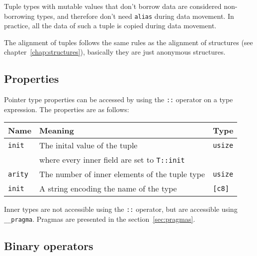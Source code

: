 Tuple types with mutable values that don't borrow data are considered
non-borrowing types, and therefore don't need \texttt{alias} during data
movement. In practice, all the data of such a tuple is copied during data
movement.

The alignment of tuples follows the same rules as the alignment of structures
(see chapter~\ref{chap:structures}), basically they are just anonymous
structures.

\subsection {Properties}

Pointer type properties can be accessed by using the \texttt{::} operator on a
type expression. The properties are as follows:
\smallskip

\begin{center}
  \begin{adjustbox}{max width=\linewidth}
    \begin{tabular}{|l|ll|}
      \hline
      Name & Meaning & Type\\
      \hline
      \hline
      \texttt{init} & The inital value of the tuple & \texttt{usize} \\
      & where every inner field are set to \texttt{T::init} & \\
      \Xhline{0.001pt}
      \texttt{arity} & The number of inner elements of the tuple type & \texttt{usize}\\
      \hline
      \texttt{init} & A string encoding the name of the type & \texttt{[c8]} \\
      \hline
    \end{tabular}
  \end{adjustbox}
\end{center}

\smallskip

Inner types are not accessible using the \texttt{::} operator, but are
accessible using \texttt{\_\_pragma}. Pragmas are presented in the
section~\ref{sec:pragmas}.

\subsection {Binary operators}

